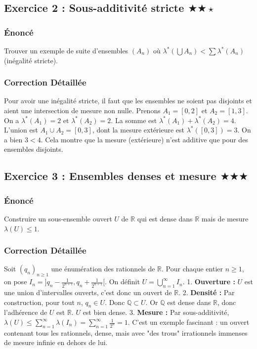 \documentclass[11pt,a4paper]{article}
\begin{document}
\subsection*{Exercice 2 : Sous-additivité stricte \quad $\displaystyle \bigstar\bigstar\star$}


\subsubsection*{Énoncé}

Trouver un exemple de suite d'ensembles $(A_n)$ où $\lambda^*(\bigcup A_n) < \sum \lambda^*(A_n)$ (inégalité stricte).

\subsubsection*{Correction Détaillée}

Pour avoir une inégalité stricte, il faut que les ensembles ne soient pas disjoints et aient une intersection de mesure non nulle.
Prenons $A_1 = [0, 2]$ et $A_2 = [1, 3]$.
On a $\lambda^*(A_1) = 2$ et $\lambda^*(A_2) = 2$. La somme est $\lambda^*(A_1) + \lambda^*(A_2) = 4$.
L'union est $A_1 \cup A_2 = [0, 3]$, dont la mesure extérieure est $\lambda^*([0, 3]) = 3$.
On a bien $3 < 4$. Cela montre que la mesure (extérieure) n'est additive que pour des ensembles disjoints.


\subsection*{Exercice 3 : Ensembles denses et mesure \quad $\displaystyle \bigstar\bigstar\bigstar$}


\subsubsection*{Énoncé}

Construire un sous-ensemble ouvert $U$ de $\mathbb{R}$ qui est dense dans $\mathbb{R}$ mais de mesure $\lambda(U) \le 1$.

\subsubsection*{Correction Détaillée}

Soit $(q_n)_{n \ge 1}$ une énumération des rationnels de $\mathbb{R}$.
Pour chaque entier $n \ge 1$, on pose $I_n = ]q_n - \frac{1}{2^{n+1}}, q_n + \frac{1}{2^{n+1}}[$.
On définit $U = \bigcup_{n=1}^\infty I_n$.
1. \textbf{Ouverture :} $U$ est une union d'intervalles ouverts, c'est donc un ouvert de $\mathbb{R}$.
2. \textbf{Densité :} Par construction, pour tout $n$, $q_n \in U$. Donc $\mathbb{Q} \subset U$. Or $\mathbb{Q}$ est dense dans $\mathbb{R}$, donc l'adhérence de $U$ est $\mathbb{R}$. $U$ est bien dense.
3. \textbf{Mesure :} Par sous-additivité, $\lambda(U) \le \sum_{n=1}^\infty \lambda(I_n) = \sum_{n=1}^\infty \frac{1}{2^n} = 1$.
C'est un exemple fascinant : un ouvert contenant tous les rationnels, dense, mais avec "des trous" irrationnels immenses de mesure infinie en dehors de lui.
\end{document}
